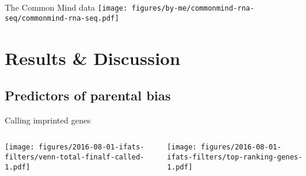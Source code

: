 \documentclass{beamer}
\begin{document}
\begin{frame}[label=cmc]{The Common Mind data}
\texttt{[image: figures/by-me/commonmind-rna-seq/commonmind-rna-seq.pdf]}
\end{frame}

\section{Results \& Discussion}
\subsection{Predictors of parental bias}

\begin{frame}
\tableofcontents[currentsection]
\end{frame}

\begin{frame}[label=filtering-calling]{Calling imprinted genes}
\begin{columns}[t]
\begin{column}{0.5\textwidth}

\texttt{[image: figures/2016-08-01-ifats-filters/venn-total-finalf-called-1.pdf]}
\end{column}

\begin{column}{0.5\textwidth}

\texttt{[image: figures/2016-08-01-ifats-filters/top-ranking-genes-1.pdf]}
\end{column}
\end{columns}
\end{frame}
\end{document}
